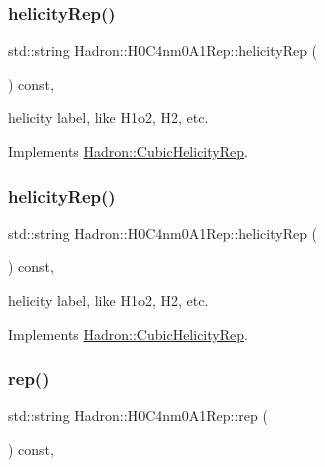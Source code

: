 \subsubsection{\texorpdfstring{helicityRep()}{helicityRep()}\hspace{0.1cm}{\footnotesize\ttfamily [2/3]}}
{\footnotesize\ttfamily std\+::string Hadron\+::\+H0\+C4nm0\+A1\+Rep\+::helicity\+Rep (\begin{DoxyParamCaption}{ }\end{DoxyParamCaption}) const\hspace{0.3cm}{\ttfamily [inline]}, {\ttfamily [virtual]}}

helicity label, like H1o2, H2, etc. 

Implements \mbox{\hyperlink{structHadron_1_1CubicHelicityRep_af1096946b7470edf0a55451cc662f231}{Hadron\+::\+Cubic\+Helicity\+Rep}}.

\mbox{\label{structHadron_1_1H0C4nm0A1Rep_a2c5a6923713010a76a5139a03ae879cf}} 
\subsubsection{\texorpdfstring{helicityRep()}{helicityRep()}\hspace{0.1cm}{\footnotesize\ttfamily [3/3]}}
{\footnotesize\ttfamily std\+::string Hadron\+::\+H0\+C4nm0\+A1\+Rep\+::helicity\+Rep (\begin{DoxyParamCaption}{ }\end{DoxyParamCaption}) const\hspace{0.3cm}{\ttfamily [inline]}, {\ttfamily [virtual]}}

helicity label, like H1o2, H2, etc. 

Implements \mbox{\hyperlink{structHadron_1_1CubicHelicityRep_af1096946b7470edf0a55451cc662f231}{Hadron\+::\+Cubic\+Helicity\+Rep}}.

\mbox{\label{structHadron_1_1H0C4nm0A1Rep_a30712f6aadf0e0304142526d08c2822e}} 
\subsubsection{\texorpdfstring{rep()}{rep()}\hspace{0.1cm}{\footnotesize\ttfamily [1/5]}}
{\footnotesize\ttfamily std\+::string Hadron\+::\+H0\+C4nm0\+A1\+Rep\+::rep (\begin{DoxyParamCaption}{ }\end{DoxyParamCaption}) const\hspace{0.3cm}{\ttfamily [inline]}, {\ttfamily [virtual]}}



